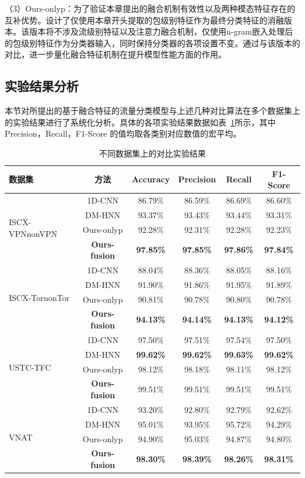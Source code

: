 （3）Ours-onlyp：为了验证本章提出的融合机制有效性以及两种模态特征存在的互补优势。设计了仅使用本章开头提取的包级别特征作为最终分类特征的消融版本。该版本将不涉及流级别特征以及注意力融合机制，仅使用n-gram嵌入处理后的包级别特征作为分类器输入，同时保持分类器的各项设置不变。通过与该版本的对比，进一步量化融合特征机制在提升模型性能方面的作用。

\subsection{实验结果分析}
本节对所提出的基于融合特征的流量分类模型与上述几种对比算法在多个数据集上的实验结果进行了系统化分析。具体的各项实验结果数据如表~\ref{tab:comparisonB}所示，其中Precision，Recall，F1-Score 的值均取各类别对应数值的宏平均。

\begin{table}[htbp]
\centering
\renewcommand{\arraystretch}{1.3}
\caption{不同数据集上的对比实验结果}
\label{tab:comparisonB}
\begin{tabular}{lccccc}
\toprule
\textbf{数据集} & \textbf{方法} & \textbf{Accuracy} & \textbf{Precision} & \textbf{Recall} & \textbf{F1-Score} \\ \midrule
\multirow{4}{*}{ISCX-VPNnonVPN} 
 & 1D-CNN & 86.79\% & 86.59\% & 86.69\% & 86.60\% \\
 & DM-HNN & 93.37\% & 93.43\% & 93.44\% & 93.31\% \\
 & Ours-onlyp & 92.28\% & 92.31\% & 92.28\% & 92.23\% \\
 & \textbf{Ours-fusion} & \textbf{97.85\%} & \textbf{97.85\%} & \textbf{97.86\%} & \textbf{97.84\%} \\ \midrule
\multirow{4}{*}{ISCX-TornonTor} 
 & 1D-CNN & 88.04\% & 88.36\% & 88.05\% & 88.16\% \\
 & DM-HNN & 91.90\% & 91.86\% & 91.95\% & 91.89\% \\
 & Ours-onlyp & 90.81\% & 90.78\% & 90.80\% & 90.78\% \\
 & \textbf{Ours-fusion} & \textbf{94.13\%} & \textbf{94.14\%} & \textbf{94.13\%} & \textbf{94.12\%} \\ \midrule
\multirow{4}{*}{USTC-TFC} 
 & 1D-CNN & 97.50\% & 97.51\% & 97.54\% & 97.50\% \\
 & DM-HNN & \textbf{99.62\%} & \textbf{99.62\%} & \textbf{99.63\%}& \textbf{99.62\%} \\
 & Ours-onlyp & 98.12\% & 98.18\% & 98.11\% & 98.12\% \\
 & \textbf{Ours-fusion} & 99.51\% & 99.51\% & 99.51\% & 99.51\% \\ \midrule
\multirow{4}{*}{VNAT} 
 & 1D-CNN & 93.20\% & 92.80\% & 92.79\% & 92.62\% \\
 & DM-HNN & 95.01\% & 93.95\% & 95.72\% & 94.29\% \\
 & Ours-onlyp & 94.90\% & 95.03\% & 94.87\% & 94.80\% \\
 & \textbf{Ours-fusion} & \textbf{98.30\%} & \textbf{98.39\%} & \textbf{98.26\%} & \textbf{98.31\%} \\ \bottomrule
\end{tabular}
\end{table}

